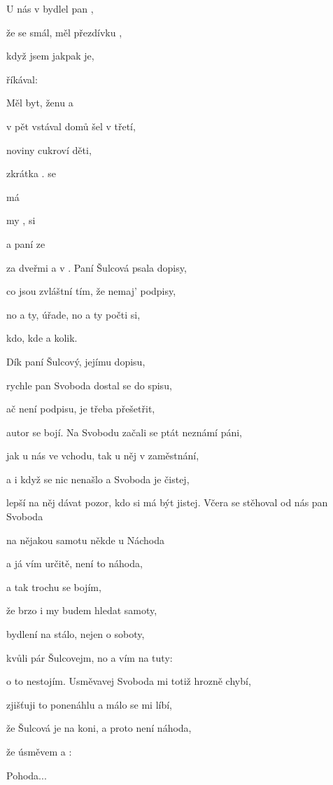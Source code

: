 

\zs
U nás v  bydlel pan , 

že se  smál, měl přezdívku , 

když jsem  jakpak  je, 

říkával:  

Měl  byt, ženu a 

v pět vstával  domů šel v  třetí, 

noviny  cukroví  děti, 

zkrátka . 
\ks
\zr
{} se  

 má   

 my ,  si 

a  paní  ze  

  za dveřmi a  v . 
\kr
\zs
Paní Šulcová psala dopisy, 

co jsou zvláštní tím, že nemaj' podpisy, 

no a ty, úřade, no a ty počti si, 

kdo, kde a kolik.

Dík paní Šulcový, jejímu dopisu,

rychle pan Svoboda dostal se do spisu, 

ač není podpisu, je třeba přešetřit, 

autor se bojí. 
\ks
\zr
Na Svobodu začali se ptát neznámí páni, 

jak u nás ve vchodu, tak u něj v zaměstnání, 

a i když se nic nenašlo a Svoboda je čistej, 

lepší na něj dávat pozor, kdo si má být jistej. 
\kr
\zs
Včera se stěhoval od nás pan Svoboda 

na nějakou samotu někde u Náchoda 

a já vím určitě, není to náhoda, 

a tak trochu se bojím, 

že brzo i my budem hledat samoty, 

bydlení na stálo, nejen o soboty, 

kvůli pár Šulcovejm, no a vím na tuty: 

o to nestojím. 
\ks
\zr
Usměvavej Svoboda mi totiž hrozně chybí, 

zjišťuji to ponenáhlu a málo se mi líbí, 

že Šulcová je na koni, a proto není náhoda, 

že  úsměvem a : 

Pohoda...
\kr
\kp

